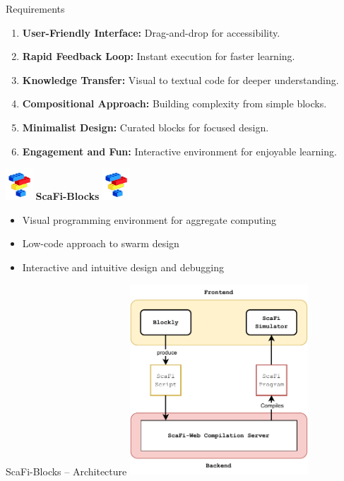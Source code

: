 \documentclass[aspectratio=169]{beamer}
\begin{document}
\begin{frame}{Requirements}
	\begin{enumerate}
    \item \textbf{User-Friendly Interface:} Drag-and-drop for accessibility.
    \item \textbf{Rapid Feedback Loop:} Instant execution for faster learning.
    \item \textbf{Knowledge Transfer:} Visual to textual code for deeper understanding.
    \item \textbf{Compositional Approach:} Building complexity from simple blocks.
    \item \textbf{Minimalist Design:} Curated blocks for focused design.
    \item \textbf{Engagement and Fun:} Interactive environment for enjoyable learning.
\end{enumerate}

\end{frame}
\begin{frame}[standout]
	\includegraphics[width=1cm]{img/scafiblocks-logo.png}
	\Huge{\textbf{ScaFi-Blocks}}
	\includegraphics[width=1cm]{img/scafiblocks-logo.png}
	\Large{
		\begin{itemize}
			\item \alert{Visual programming environment} for aggregate computing
			\item \alert{Low-code} approach to swarm design
			\item \alert{Interactive} and \alert{intuitive} design and debugging
		\end{itemize}}
\end{frame}
\begin{frame}{ScaFi-Blocks -- Architecture}
	\centering
	\includegraphics[width=0.5\textwidth]{img/scafi-blocks-architecture.drawio.pdf}
\end{frame}
\end{document}
